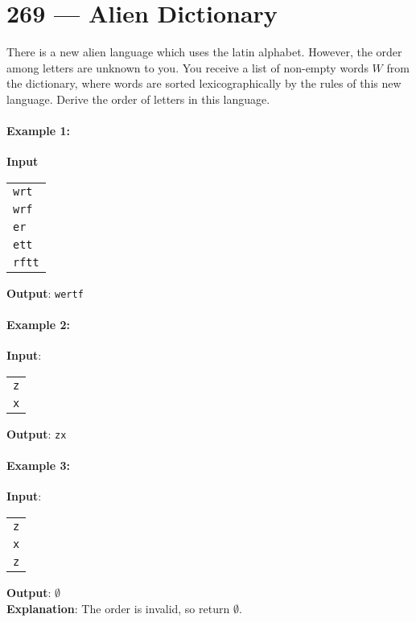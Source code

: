 \section{269 --- Alien Dictionary}
There is a new alien language which uses the latin alphabet. However, the order among letters are unknown to you. You receive a list of non-empty words $W$ from the dictionary, where words are sorted lexicographically by the rules of this new language. Derive the order of letters in this language.

\paragraph{Example 1:}

\begin{flushleft}
\textbf{Input}
\begin{table}[H]
\begin{tabular}{l}
\texttt{wrt}  \\
\texttt{wrf}  \\
\texttt{er}   \\
\texttt{ett}  \\
\texttt{rftt}
\end{tabular}
\end{table}
\textbf{Output}: \texttt{wertf}
\end{flushleft}

\paragraph{Example 2:}

\begin{flushleft}
\textbf{Input}:
\begin{table}[H]
\begin{tabular}{l}
\texttt{z}  \\
\texttt{x} 
\end{tabular}
\end{table}
\textbf{Output}: \texttt{zx}
\end{flushleft}

\paragraph{Example 3:}

\begin{flushleft}
\textbf{Input}:
\begin{table}[H]
\begin{tabular}{l}
\texttt{z}  \\
\texttt{x} \\
\texttt{z} 
\end{tabular}
\end{table}
\textbf{Output}: $\emptyset$
\\
\textbf{Explanation}: The order is invalid, so return  $\emptyset$.
\end{flushleft}

